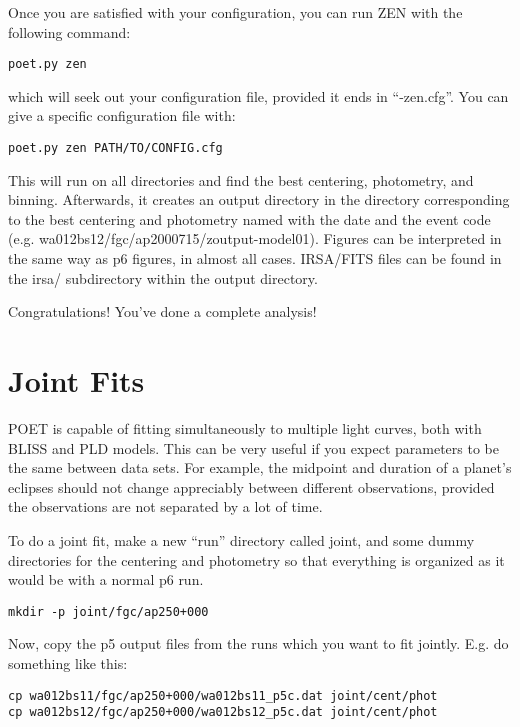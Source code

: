 \documentclass[letterpaper,12pt]{article}
\begin{document}
Once you are satisfied with your configuration, you can run ZEN with
the following command:

\begin{verbatim}
poet.py zen
\end{verbatim}

which will seek out your configuration file, provided it ends in ``-zen.cfg''. You can give a specific configuration file with:

\begin{verbatim}
poet.py zen PATH/TO/CONFIG.cfg
\end{verbatim}

This will run on all directories and find the best centering,
photometry, and binning. Afterwards, it creates an output directory in
the directory corresponding to the best centering and photometry named
with the date and the event code
(e.g. wa012bs12/fgc/ap2000715/zoutput-model01).  Figures can be
interpreted in the same way as p6 figures, in almost all
cases. IRSA/FITS files can be found in the irsa/ subdirectory within
the output directory.

Congratulations! You've done a complete analysis!

\section{Joint Fits}
POET is capable of fitting simultaneously to multiple light curves,
both with BLISS and PLD models.  This can be very useful if
you expect parameters to be the same between data sets. For example,
the midpoint and duration of a planet's eclipses should not change
appreciably between different observations, provided the observations
are not separated by a lot of time.

To do a joint fit, make a new ``run'' directory called joint, and some
dummy directories for the centering and photometry so that everything
is organized as it would be with a normal p6 run.

\begin{verbatim}
mkdir -p joint/fgc/ap250+000
\end{verbatim}

Now, copy the p5 output files from the runs which you want to
fit jointly. E.g. do something like this:

\begin{verbatim}
cp wa012bs11/fgc/ap250+000/wa012bs11_p5c.dat joint/cent/phot
cp wa012bs12/fgc/ap250+000/wa012bs12_p5c.dat joint/cent/phot
\end{verbatim}
\end{document}
